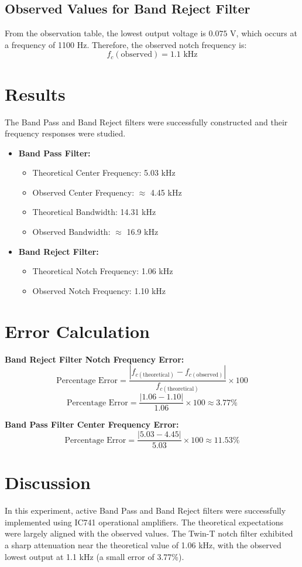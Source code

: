 \documentclass[12pt,a4paper]{article}
\begin{document}
\subsection{Observed Values for Band Reject Filter}
From the observation table, the lowest output voltage is $0.075$ V, which occurs at a frequency of 1100 Hz. Therefore, the observed notch frequency is:
$$f_c (\text{observed}) = 1.1 \text{ kHz}$$

\section{Results}
The Band Pass and Band Reject filters were successfully constructed and their frequency responses were studied. 
\begin{itemize}
    \item \textbf{Band Pass Filter:} 
    \begin{itemize}
        \item Theoretical Center Frequency: 5.03 kHz
        \item Observed Center Frequency: $\approx$ 4.45 kHz
        \item Theoretical Bandwidth: 14.31 kHz
        \item Observed Bandwidth: $\approx$ 16.9 kHz
    \end{itemize}
    \item \textbf{Band Reject Filter:}
    \begin{itemize}
        \item Theoretical Notch Frequency: 1.06 kHz
        \item Observed Notch Frequency: 1.10 kHz
    \end{itemize}
\end{itemize}

\section{Error Calculation}
\textbf{Band Reject Filter Notch Frequency Error:}
$$\text{Percentage Error} = \frac{|f_{c(\text{theoretical})} - f_{c(\text{observed})}|}{f_{c(\text{theoretical})}} \times 100$$
$$\text{Percentage Error} = \frac{|1.06 - 1.10|}{1.06} \times 100 \approx 3.77\%$$

\textbf{Band Pass Filter Center Frequency Error:}
$$\text{Percentage Error} = \frac{|5.03 - 4.45|}{5.03} \times 100 \approx 11.53\%$$

\section{Discussion}
In this experiment, active Band Pass and Band Reject filters were successfully implemented using IC741 operational amplifiers. The theoretical expectations were largely aligned with the observed values. The Twin-T notch filter exhibited a sharp attenuation near the theoretical value of 1.06 kHz, with the observed lowest output at 1.1 kHz (a small error of 3.77\%). 
\end{document}

